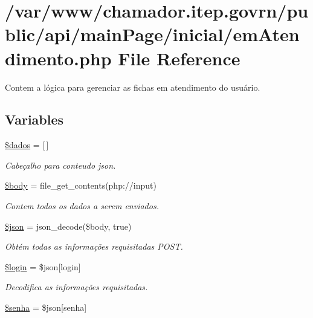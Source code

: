 \hypertarget{em_atendimento_8php}{}\section{/var/www/chamador.itep.\+govrn/public/api/main\+Page/inicial/em\+Atendimento.php File Reference}
\label{em_atendimento_8php}


Contem a lógica para gerenciar as fichas em atendimento do usuário.  


\subsection*{Variables}
\begin{DoxyCompactItemize}
\item 
\hyperlink{em_atendimento_8php_a252370d95039a38fa11afab784725d58}{\$dados} = \mbox{[}$\,$\mbox{]}
\begin{DoxyCompactList}\small\item\em Cabeçalho para conteudo json. \end{DoxyCompactList}\item 
\hyperlink{em_atendimento_8php_a26b9f9373f7bb79dfcf8a86dff086b45}{\$body} = file\+\_\+get\+\_\+contents(\textquotesingle{}php\+://input\textquotesingle{})
\begin{DoxyCompactList}\small\item\em Contem todos os dados a serem enviados. \end{DoxyCompactList}\item 
\hyperlink{em_atendimento_8php_acedd13b51401130848ce18f4d5c52605}{\$json} = json\+\_\+decode(\$body, true)
\begin{DoxyCompactList}\small\item\em Obtém todas as informações requisitadas P\+O\+ST. \end{DoxyCompactList}\item 
\hyperlink{em_atendimento_8php_afc31993e855f9631572adfedcfe6f34b}{\$login} = \$json\mbox{[}\textquotesingle{}login\textquotesingle{}\mbox{]}
\begin{DoxyCompactList}\small\item\em Decodifica as informações requisitadas. \end{DoxyCompactList}\item 
\hyperlink{em_atendimento_8php_a3678c8769c9698fd30581c1016c5f475}{\$senha} = \$json\mbox{[}\textquotesingle{}senha\textquotesingle{}\mbox{]}

\end{DoxyCompactItemize}
